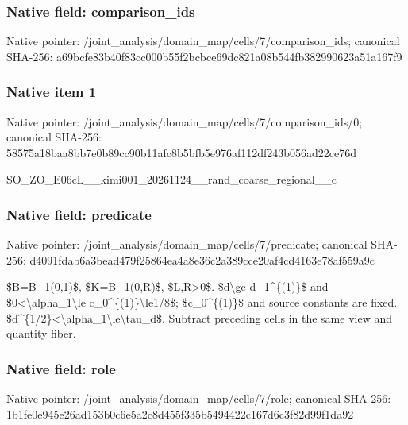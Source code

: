 \documentclass[10pt,a4paper]{article}
\begin{document}
\subsubsection{Native field: comparison\_ids}


Native pointer: /joint\_analysis/domain\_m\allowbreak{}ap/cells/7/comparison\_id\allowbreak{}s; canonical SHA-256: a69bcfe83b40f83cc000b55f\allowbreak{}2bcbce69dc821a08b544fb38\allowbreak{}2990623a51a167f9



\subsubsection{Native item 1}


Native pointer: /joint\_analysis/domain\_m\allowbreak{}ap/cells/7/comparison\_id\allowbreak{}s/0; canonical SHA-256: 58575a18baa8bb7e0b89cc90\allowbreak{}b11afc8b5bfb5e976af112df\allowbreak{}243b056ad22ce76d


SO\_ZO\_E06cL\_\_kimi001\_202\allowbreak{}61124\_\_rand\_coarse\_regio\allowbreak{}nal\_\_c


\subsubsection{Native field: predicate}


Native pointer: /joint\_analysis/domain\_m\allowbreak{}ap/cells/7/predicate; canonical SHA-256: d4091fdab6a3bead479f2586\allowbreak{}4ea4a8e36c2a389cce20af4c\allowbreak{}d4163e78af559a9c


\$B=B\_1(0,1)\$, \$K=B\_1(0,R)\$, \$L,R>0\$. \$d\textbackslash{}ge d\_1\textasciicircum{}\{(1)\}\$ and \$0<\textbackslash{}alpha\_1\textbackslash{}le c\_0\textasciicircum{}\{(1)\}\textbackslash{}le1/8\$; \$c\_0\textasciicircum{}\{(1)\}\$ and source constants are fixed. \$d\textasciicircum{}\{1/2\}<\textbackslash{}alpha\_1\textbackslash{}le\textbackslash{}tau\_d\$. Subtract preceding cells in the same view and quantity fiber.


\subsubsection{Native field: role}


Native pointer: /joint\_analysis/domain\_map/cells/7/role; canonical SHA-256: 1b1fe0e945e26ad153b0c6e5\allowbreak{}a2c8d455f335b5494422c167\allowbreak{}d6c3f82d99f1da92
\end{document}

